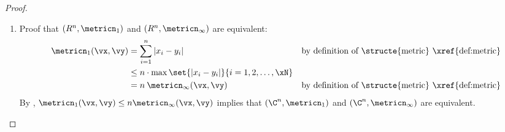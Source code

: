 {\begin{proof}
\begin{enumerate}
\begin{align*}
  \metricn_2(\vx,\vy)
    &\le \metricn_2(\vx,\vz^{(1)}) + \metricn(\vz^{(1)},\vy)
    &&   \text{by definition of \structe{metric} \xref{def:metric}}
  \\&\le \metricn_2(\vx,\vz^{(1)}) + \metricn(\vz^{(1)},\vz^{(2)}) + \metricn(\vz^{(2)},\vy)
    &&   \text{by definition of \structe{metric} \xref{def:metric}}
  \\&\le \metricn_2(\vx,\vz^{(1)}) + \metricn(\vz^{(1)},\vz^{(2)}) +
         \metricn(\vz^{(2)},\vz^{(3)}) + \metricn(\vz^{(3)},\vy)
    &&   \text{by definition of \structe{metric} \xref{def:metric}}
  \\&\vdots
  \\&\le \metricn_2(\vx,\vz^{(1)})
       + \metricn(\vz^{(1)},\vz^{(2)})
       + \metricn(\vz^{(2)},\vz^{(3)})
       + \cdots
       \\&\qquad
       + \metricn(\vz^{(n-2)},\vz^{(n-1)})
       + \metricn(\vz^{(n-1)},\vy)
    &&   \text{by definition of \structe{metric} \xref{def:metric}}
  \\&=   \sqrt{\sum_{i=1}^n |x_i-z^{(1)}_i|^2}
       + \sqrt{\sum_{i=1}^n |z^{(1)}_i-z^{(2)}_i|^2}
       + \cdots
       \\&\qquad
       + \sqrt{\sum_{i=1}^n |z^{(n-2)}_i-z^{(n-1)}_i|^2}
       + \sqrt{\sum_{i=1}^n |z^{(n-1)}_i-y_i|^2}
  \\&=   \sqrt{|x_1-y_1|^2}
       + \sqrt{|x_2-y_2|^2}
       + \sqrt{|x_3-y_3|^2}
       + \cdots
       \\&\qquad
       + \sqrt{|x_{n-1}-y_{n-1}|^2}
       + \sqrt{|x_n-y_n|^2}
  \\&=   \abs{x_1-y_1}
       + \abs{x_2-y_2}
       + \abs{x_3-y_3}
       + \cdots
       + \abs{x_n-y_n}
  \\&=   \sum_{i=1}^n \abs{x_i-y_i}
  \\&=   \metricn_1(\vx,\vy)
    &&   \text{by definition of \structe{metric} \xref{def:metric}}
\end{align*}

By , $\metricn_2(\vx,\vy)\le \metricn_1(\vx,\vy)$ implies
that $(R^n,\metricn_1)$ and $(R^n,\metricn_2)$ are equivalent.


\item Proof that $(R^n,\metricn_1)$ and $(R^n,\metricn_\infty)$ are equivalent:
\begin{align*}
  \metricn_1(\vx,\vy)
    &=   \sum_{i=1}^n |x_i-y_i|
    &&   \text{by definition of \structe{metric} \xref{def:metric}}
  \\&\le n\cdot \max\set{|x_i-y_i|}{i=1,2,\ldots,\xN}
  \\&=   n\: \metricn_\infty(\vx,\vy)
    &&   \text{by definition of \structe{metric} \xref{def:metric}}
\end{align*}
By , $\metricn_1(\vx,\vy)\le n\metricn_\infty(\vx,\vy)$ implies
that $(\C^n,\metricn_1)$ and $(\C^n,\metricn_\infty)$ are equivalent.


\end{enumerate}
\end{proof}}
